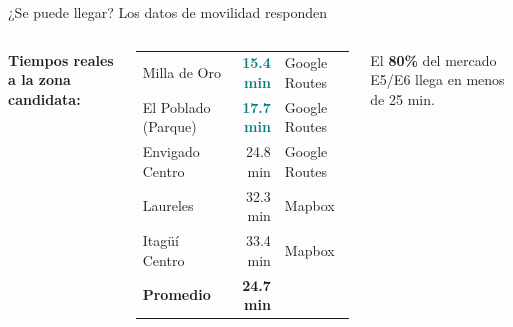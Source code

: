 \documentclass[aspectratio=169, 11pt]{beamer}
\newcommand{\highlight}[1]{\textcolor{teal}{\textbf{#1}}}
\begin{document}
\begin{frame}{¿Se puede llegar? Los datos de movilidad responden}
\begin{columns}[T]
\vspace{4pt}
{\footnotesize\textbf{Tiempos reales a la zona candidata:}}

\vspace{2pt}
{\scriptsize
\begin{tabular}{@{}lrl@{}}
Milla de Oro & \highlight{15.4 min} & Google Routes \\
El Poblado (Parque) & \highlight{17.7 min} & Google Routes \\
Envigado Centro & 24.8 min & Google Routes \\
Laureles & 32.3 min & Mapbox \\
Itagüí Centro & 33.4 min & Mapbox \\
\midrule
\textbf{Promedio} & \textbf{24.7 min} & \\
\end{tabular}
}

\vspace{2pt}
{\scriptsize El \textbf{80\%} del mercado E5/E6 llega en menos de 25 min.}
\end{columns}
\end{frame}
\end{document}
